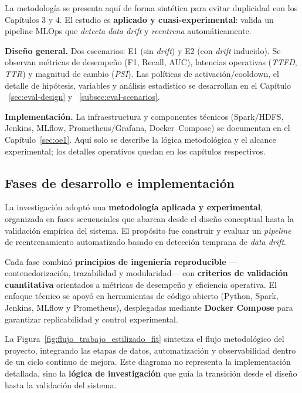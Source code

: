 La metodolog\'ia se presenta aqu\'i de forma sint\'etica para evitar duplicidad con los Cap\'itulos 3 y 4. El estudio es \textbf{aplicado y cuasi-experimental}: valida un pipeline MLOps que \textit{detecta} \textit{data drift} y \textit{reentrena} autom\'aticamente.

\textbf{Diseño general.} Dos escenarios: E1 (sin \textit{drift}) y E2 (con \textit{drift} inducido). Se observan m\'etricas de desempe\~no (F1, Recall, AUC), latencias operativas (\textit{TTFD}, \textit{TTR}) y magnitud de cambio (\textit{PSI}). Las pol\'iticas de activaci\'on/cooldown, el detalle de hip\'otesis, variables y an\'alisis estad\'istico se desarrollan en el Cap\'itulo ~\ref{sec:eval-design} y ~\ref{subsec:eval-scenarios}.

\textbf{Implementaci\'on.} La infraestructura y componentes t\'ecnicos (Spark/HDFS, Jenkins, MLflow, Prometheus/Grafana, Docker~Compose) se documentan en el Cap\'itulo~\ref{sec:oe1}. Aqu\'i solo se describe la l\'ogica metodol\'ogica y el alcance experimental; los detalles operativos quedan en los cap\'itulos respectivos.

\subsection{Fases de desarrollo e implementación}

La investigación adoptó una \textbf{metodología aplicada y experimental}, organizada en fases secuenciales que abarcan desde el diseño conceptual hasta la validación empírica del sistema. El propósito fue construir y evaluar un \textit{pipeline} de reentrenamiento automatizado basado en detección temprana de \textit{data drift}.

Cada fase combinó \textbf{principios de ingeniería reproducible} —contenedorización, trazabilidad y modularidad— con \textbf{criterios de validación cuantitativa} orientados a métricas de desempeño y eficiencia operativa. El enfoque técnico se apoyó en herramientas de código abierto (Python, Spark, Jenkins, MLflow y Prometheus), desplegadas mediante \textbf{Docker Compose} para garantizar replicabilidad y control experimental.

\noindent
La Figura~\ref{fig:flujo_trabajo_estilizado_fit} sintetiza el flujo metodológico del proyecto, integrando las etapas de datos, automatización y observabilidad dentro de un ciclo continuo de mejora. Este diagrama no representa la implementación detallada, sino la \textbf{lógica de investigación} que guía la transición desde el diseño hasta la validación del sistema.

